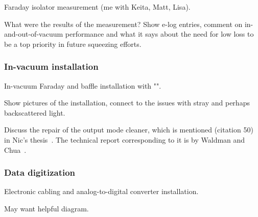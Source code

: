                 Faraday isolator measurement (me with Keita, Matt, Lisa).

		What were the results of the measurement? Show e-log entries, comment on in-and-out-of-vacuum performance and what it says about the need for low loss to be a top priority in future squeezing efforts.

            \subsubsection{In-vacuum installation}
            \label{In-vacuum}

                In-vacuum Faraday and baffle installation with "".

                Show pictures of the installation, connect to the issues with stray and perhaps backscattered light.

		Discuss the repair of the output mode cleaner, which is mentioned (citation 50) in Nic's thesis~\cite{SmithThesis}. The technical report corresponding to it is by Waldman and Chua~\cite{Waldman2011}.

            \subsubsection{Data digitization}
            \label{data_digitization}

                Electronic cabling and analog-to-digital converter installation.

		May want helpful diagram.






